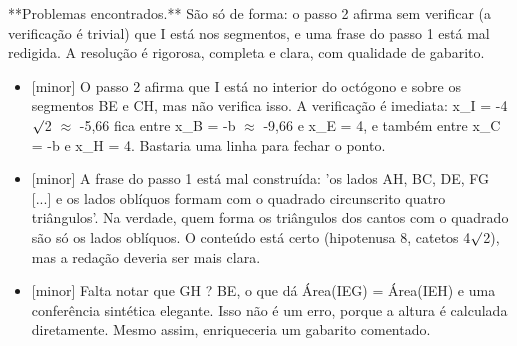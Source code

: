 \documentclass{article}%
\begin{document}
\newline%
**Problemas encontrados.** São só de forma: o passo 2 afirma sem verificar (a verificação é trivial) que I está nos segmentos, e uma frase do passo 1 está mal redigida. A resolução é rigorosa, completa e clara, com qualidade de gabarito.%
\begin{itemize}%
\item%
{[}minor{]} O passo 2 afirma que I está no interior do octógono e sobre os segmentos BE e CH, mas não verifica isso. A verificação é imediata: x\_I = -4$\surd$2 $\approx$ -5,66 fica entre x\_B = -b $\approx$ -9,66 e x\_E = 4, e também entre x\_C = -b e x\_H = 4. Bastaria uma linha para fechar o ponto.%
\item%
{[}minor{]} A frase do passo 1 está mal construída: 'os lados AH, BC, DE, FG {[}...{]} e os lados oblíquos formam com o quadrado circunscrito quatro triângulos'. Na verdade, quem forma os triângulos dos cantos com o quadrado são só os lados oblíquos. O conteúdo está certo (hipotenusa 8, catetos 4$\surd$2), mas a redação deveria ser mais clara.%
\item%
{[}minor{]} Falta notar que GH ? BE, o que dá Área(IEG) = Área(IEH) e uma conferência sintética elegante. Isso não é um erro, porque a altura é calculada diretamente. Mesmo assim, enriqueceria um gabarito comentado.%
\end{itemize}%
\end{document}
